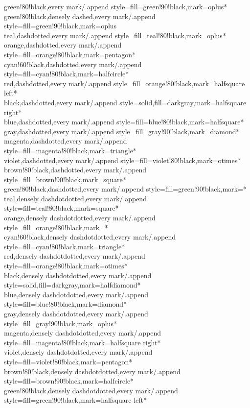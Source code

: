 \documentclass[a4paper]{article}
\begin{document}
{	green!80!black,every mark/.append style={fill=green!90!black},mark=oplus*\\
	green!80!black,densely dashed,every mark/.append style={fill=green!90!black},mark=oplus\\
	teal,dashdotted,every mark/.append style={fill=teal!80!black},mark=oplus*\\
	orange,dashdotted,every mark/.append style={fill=orange!80!black},mark=pentagon*\\
	cyan!60!black,dashdotted,every mark/.append style={fill=cyan!80!black},mark=halfcircle*\\
	red,dashdotted,every mark/.append style={fill=orange!80!black},mark=halfsquare left*\\
	black,dashdotted,every mark/.append style={solid,fill=darkgray},mark=halfsquare right*\\
	blue,dashdotted,every mark/.append style={fill=blue!80!black},mark=halfsquare*\\
	gray,dashdotted,every mark/.append style={fill=gray!90!black},mark=diamond*\\
	magenta,dashdotted,every mark/.append style={fill=magenta!80!black},mark=triangle*\\
	violet,dashdotted,every mark/.append style={fill=violet!80!black},mark=otimes*\\
	brown!80!black,dashdotted,every mark/.append style={fill=brown!90!black},mark=square*\\
	green!80!black,dashdotted,every mark/.append style={fill=green!90!black},mark=*\\
	teal,densely dashdotdotted,every mark/.append style={fill=teal!80!black},mark=square*\\
	orange,densely dashdotdotted,every mark/.append style={fill=orange!80!black},mark=*\\
	cyan!60!black,densely dashdotdotted,every mark/.append style={fill=cyan!80!black},mark=triangle*\\
	red,densely dashdotdotted,every mark/.append style={fill=orange!80!black},mark=otimes*\\
	black,densely dashdotdotted,every mark/.append style={solid,fill=darkgray},mark=halfdiamond*\\
	blue,densely dashdotdotted,every mark/.append style={fill=blue!80!black},mark=diamond*\\
	gray,densely dashdotdotted,every mark/.append style={fill=gray!90!black},mark=oplus*\\
	magenta,densely dashdotdotted,every mark/.append style={fill=magenta!80!black},mark=halfsquare right*\\
	violet,densely dashdotdotted,every mark/.append style={fill=violet!80!black},mark=pentagon*\\
	brown!80!black,densely dashdotdotted,every mark/.append style={fill=brown!90!black},mark=halfcircle*\\
	green!80!black,densely dashdotdotted,every mark/.append style={fill=green!90!black},mark=halfsquare left*\\
}
\end{document}
